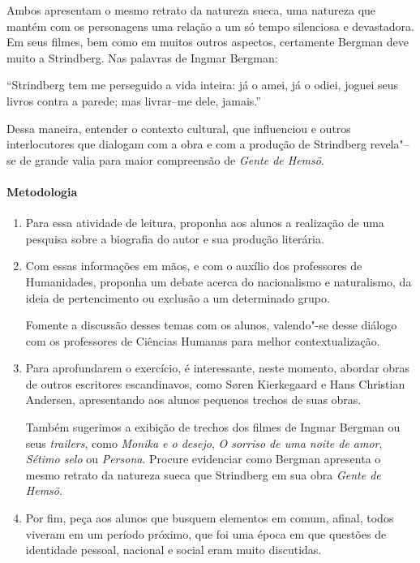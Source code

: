 \documentclass[12pt]{extarticle}
\begin{document}
Ambos apresentam o mesmo retrato da natureza sueca, uma natureza que 
mantém com os personagens uma relação a um só tempo silenciosa e 
devastadora. Em seus filmes, bem como em muitos outros aspectos, 
certamente Bergman deve muito a Strindberg. Nas palavras de Ingmar Bergman: 

``Strindberg tem me perseguido a vida inteira: já o
amei, já o odiei, joguei seus livros contra a
parede; mas livrar--me dele, jamais.''

Dessa maneira, entender o contexto cultural, que influenciou  e outros 
interlocutores que dialogam com a obra e com a produção de Strindberg 
revela"--se de grande valia para maior compreensão de \emph{Gente de Hemsö}.

\paragraph{Metodologia}

\begin{enumerate}

\item
Para essa atividade de leitura, proponha aos alunos a realização de uma 
pesquisa sobre a biografia do autor e sua produção literária. 

\item
Com essas informações em mãos, e com o auxílio dos professores de
Humanidades, proponha um debate acerca do nacionalismo e naturalismo, da 
ideia de pertencimento ou exclusão a um determinado grupo.

Fomente a discussão desses temas com os
alunos, valendo"-se desse diálogo com os professores de Ciências Humanas 
para melhor contextualização. 

\item
Para aprofundarem o exercício, é interessante, neste momento, abordar 
obras de outros escritores escandinavos, como Søren Kierkegaard e Hans 
Christian Andersen, apresentando aos alunos pequenos trechos de suas obras.

Também sugerimos a exibição de trechos dos filmes de Ingmar Bergman 
ou seus \textit{trailers}, 
como \emph{Monika e o desejo}, \emph{O sorriso de uma noite de amor}, 
\emph{Sétimo selo} ou \emph{Persona}. Procure evidenciar como Bergman 
apresenta o mesmo retrato da 
natureza sueca que Strindberg em sua obra \emph{Gente de Hemsö}. 

\item
Por fim, peça aos alunos que busquem elementos em comum, afinal, todos 
viveram em um período próximo, que foi uma época em que questões de 
identidade pessoal, nacional e social eram muito discutidas.

\end{enumerate}
\end{document}
